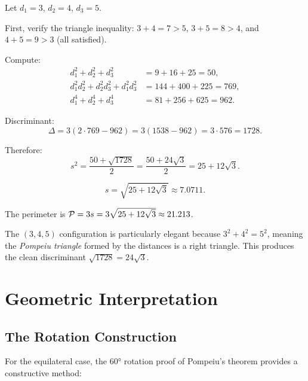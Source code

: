 \begin{example}
Let $d_1 = 3$, $d_2 = 4$, $d_3 = 5$.

First, verify the triangle inequality: $3 + 4 = 7 > 5$, $3 + 5 = 8 > 4$, and $4 + 5 = 9 > 3$ (all satisfied).

Compute:
\begin{align}
d_1^2 + d_2^2 + d_3^2 &= 9 + 16 + 25 = 50, \\
d_1^2 d_2^2 + d_2^2 d_3^2 + d_1^2 d_3^2 &= 144 + 400 + 225 = 769, \\
d_1^4 + d_2^4 + d_3^4 &= 81 + 256 + 625 = 962.
\end{align}

Discriminant:
\begin{equation}
\Delta = 3(2 \cdot 769 - 962) = 3(1538 - 962) = 3 \cdot 576 = 1728.
\end{equation}

Therefore:
\begin{equation}
s^2 = \frac{50 + \sqrt{1728}}{2} = \frac{50 + 24\sqrt{3}}{2} = 25 + 12\sqrt{3}.
\end{equation}

\begin{equation}
\boxed{s = \sqrt{25 + 12\sqrt{3}} \approx 7.0711.}
\end{equation}

The perimeter is $\mathcal{P} = 3s = 3\sqrt{25 + 12\sqrt{3}} \approx 21.213$.
\end{example}

\begin{remark}
The $(3, 4, 5)$ configuration is particularly elegant because $3^2 + 4^2 = 5^2$, meaning the \emph{Pompeiu triangle} formed by the distances is a right triangle. This produces the clean discriminant $\sqrt{1728} = 24\sqrt{3}$.
\end{remark}

\section{Geometric Interpretation}

\subsection{The Rotation Construction}

For the equilateral case, the $60°$ rotation proof of Pompeiu's theorem provides a constructive method:

